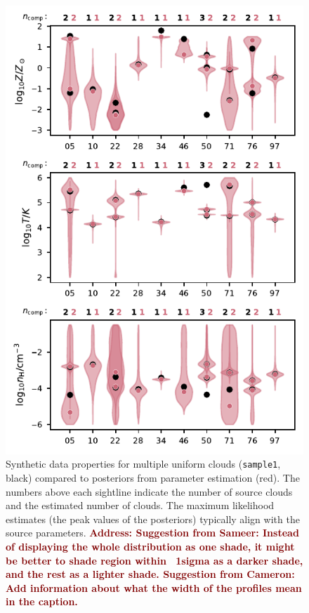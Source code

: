 \documentclass[fleqn,usenatbib]{mnras}
\newcommand{\todo}[1]{\textcolor{Maroon}{\textbf{Address: #1}}}
\begin{document}
\begin{figure}
    \centering
    \includegraphics[width=\columnwidth]{figures/sample1/comparison.pdf}
    \caption{
    Synthetic data properties for multiple uniform clouds (\texttt{sample1}, black) compared to posteriors from parameter estimation (red).
    The numbers above each sightline indicate the number of source clouds and the estimated number of clouds.
    The maximum likelihood estimates (the peak values of the posteriors) typically align with the source parameters.
    \todo{Suggestion from Sameer: Instead of displaying the whole distribution as one shade, it might be better to shade region within ~1sigma as a darker shade, and the rest as a lighter shade.
    Suggestion from Cameron: Add information about what the width of the profiles mean in the caption.}
    }
    \label{f: sample1 violin}
\end{figure}
\end{document}
